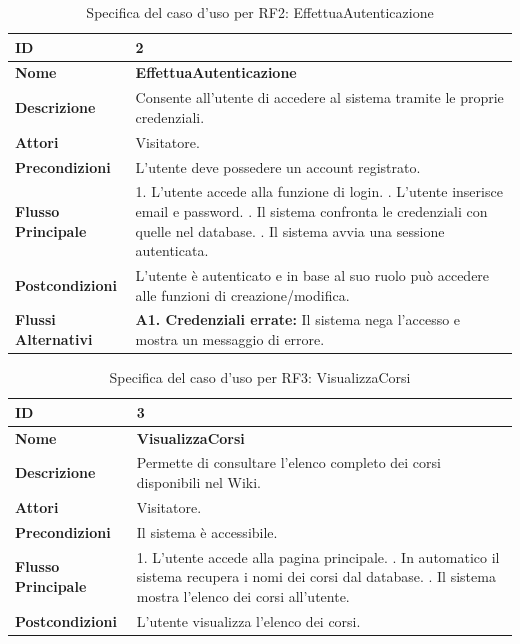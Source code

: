 \begin{table}[H]
    \small
    \caption{Specifica del caso d'uso per RF2: EffettuaAutenticazione}
    \begin{tabularx}{\textwidth}{@{}l X@{}}
        \toprule
        \textbf{ID} & 2 \\
        \midrule
        \textbf{Nome} & \textbf{EffettuaAutenticazione} \\
        \midrule
        \textbf{Descrizione} & Consente all'utente di accedere al sistema tramite le proprie credenziali. \\
        \midrule
        \textbf{Attori} & Visitatore. \\
        \midrule
        \textbf{Precondizioni} & L'utente deve possedere un account registrato. \\
        \midrule
        \textbf{Flusso Principale} & 
        1. L'utente accede alla funzione di login. \newline
        2. L'utente inserisce email e password. \newline
        3. Il sistema confronta le credenziali con quelle nel database. \newline
        4. Il sistema avvia una sessione autenticata. \\
        \midrule
        \textbf{Postcondizioni} & L'utente è autenticato e in base al suo ruolo può accedere alle funzioni di creazione/modifica. \\
        \midrule
        \textbf{Flussi Alternativi} & \textbf{A1. Credenziali errate:} Il sistema nega l'accesso e mostra un messaggio di errore. \\
        \bottomrule
    \end{tabularx}
\end{table}

\begin{table}[H]
    \small
    \caption{Specifica del caso d'uso per RF3: VisualizzaCorsi}
    \begin{tabularx}{\textwidth}{@{}l X@{}}
        \toprule
        \textbf{ID} & 3 \\
        \midrule
        \textbf{Nome} & \textbf{VisualizzaCorsi} \\
        \midrule
        \textbf{Descrizione} & Permette di consultare l'elenco completo dei corsi disponibili nel Wiki. \\
        \midrule
        \textbf{Attori} & Visitatore. \\
        \midrule
        \textbf{Precondizioni} & Il sistema è accessibile. \\
        \midrule
        \textbf{Flusso Principale} & 
        1. L'utente accede alla pagina principale. \newline
        2. In automatico il sistema recupera i nomi dei corsi dal database. \newline
        3. Il sistema mostra l'elenco dei corsi all'utente. \\
        \midrule
        \textbf{Postcondizioni} & L'utente visualizza l'elenco dei corsi. \\
        \bottomrule
    \end{tabularx}
\end{table}


